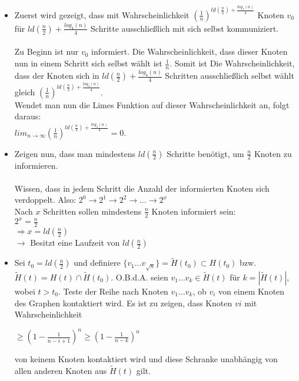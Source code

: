 \documentclass[12pt,a4paper]{report}
\begin{document}
\begin{itemize}
	\item Zuerst wird gezeigt, dass mit	Wahrscheinlichkeit $(\frac{1}{n})^{ld(\frac{n}{2})+\frac{log_4(n)}{4}}$ Knoten $v_0$ für $ld(\frac{n}{2})+\frac{log_4(n)}{4}$ Schritte ausschließlich mit sich selbst kommuniziert.\\
	\\
	Zu Beginn ist nur $v_0$ informiert. Die Wahrscheinlichkeit, dass dieser Knoten nun in einem Schritt sich selbst wählt ist $\frac{1}{n}$. Somit ist Die Wahrscheinlichkeit, dass der Knoten sich in  $ld(\frac{n}{2})+\frac{log_4(n)}{4}$ Schritten ausschließlich selbst wählt gleich $(\frac{1}{n})^{ld(\frac{n}{2})+\frac{log_4(n)}{4}}$.\\
	Wendet man nun die Limes Funktion auf dieser Wahrscheinlichkeit an, folgt daraus:\\
	$lim_{n\rightarrow \infty}(\frac{1}{n})^{ld(\frac{n}{2})+\frac{log_4(n)}{4}} = 0$.
	\item Zeigen nun, dass man mindestens $ld(\frac{n}{2})$ Schritte benötigt, um $\frac{n}{2}$ Knoten zu informieren.\\
	\\
	Wissen, dass in jedem Schritt die Anzahl der informierten Knoten sich verdoppelt.
	Also: $2^0 \rightarrow 2^1 \rightarrow 2^2 \rightarrow \dots \rightarrow 2^x$\\
	Nach $x$ Schritten sollen mindestens $\frac{n}{2}$ Knoten informiert sein:\\
	$2^x = \frac{n}{2}$\\
	$\Rightarrow x = ld(\frac{n}{2})$\\
	$\rightarrow$ Besitzt eine Laufzeit von $ld(\frac{n}{2})$\\
	\item Sei $t_0 = ld(\frac{n}{2})$ und definiere $\{v_1 \dots v_{\sqrt{n}}\} = \tilde{H}(t_0) \subset H(t_0)$ bzw. \\
	$\tilde{H}(t) = H(t) \cap \tilde{H}(t_0)$. O.B.d.A. seien $v_1 \dots v_k \in \tilde{H}(t)$ für $k=|\tilde{H}(t)|$, wobei $t>t_0$. Teste der Reihe nach Knoten $v_1 \dots v_k$, ob $v_i$ von einem Knoten des Graphen kontaktiert wird. Es ist zu zeigen, dass Knoten $vi$ mit Wahrscheinlichkeit
	\begin{center}
		$ \ge (1-\frac{1}{n-i+1})^n \ge (1-\frac{1}{n-k})^n$
	\end{center}
	von keinem Knoten kontaktiert wird und diese Schranke unabhängig von allen anderen Knoten aus $\tilde{H}(t)$ gilt.\\
	\\

\end{itemize}
\end{document}
